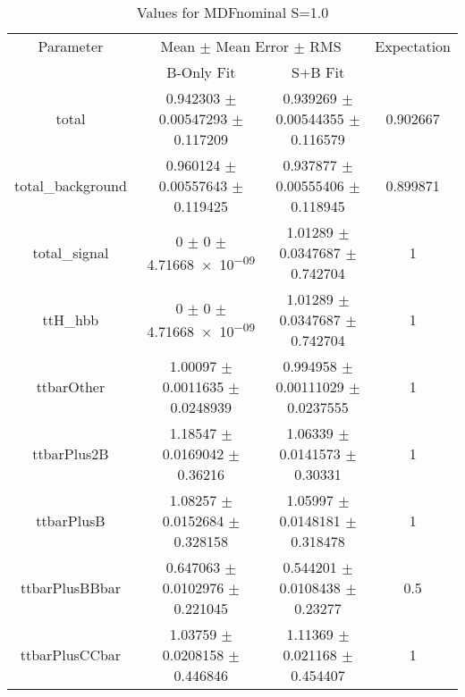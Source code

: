 \begin{table}
\centering
\caption{Values for MDFnominal S=1.0}
\begin{tabular}{cccc}
\toprule
Parameter & \multicolumn{2}{c}{Mean $\pm$ Mean Error $\pm$ RMS} & Expectation\\
 & B-Only Fit & S+B Fit & \\
\midrule
total & \num{0.942303} $\pm$ \num{0.00547293} $\pm$ \num{0.117209} & \num{0.939269} $\pm$ \num{0.00544355} $\pm$ \num{0.116579} & \num{0.902667}\\
total\_background & \num{0.960124} $\pm$ \num{0.00557643} $\pm$ \num{0.119425} & \num{0.937877} $\pm$ \num{0.00555406} $\pm$ \num{0.118945} & \num{0.899871}\\
total\_signal & \num{0} $\pm$ \num{0} $\pm$ \num{4.71668e-09} & \num{1.01289} $\pm$ \num{0.0347687} $\pm$ \num{0.742704} & \num{1}\\
ttH\_hbb & \num{0} $\pm$ \num{0} $\pm$ \num{4.71668e-09} & \num{1.01289} $\pm$ \num{0.0347687} $\pm$ \num{0.742704} & \num{1}\\
ttbarOther & \num{1.00097} $\pm$ \num{0.0011635} $\pm$ \num{0.0248939} & \num{0.994958} $\pm$ \num{0.00111029} $\pm$ \num{0.0237555} & \num{1}\\
ttbarPlus2B & \num{1.18547} $\pm$ \num{0.0169042} $\pm$ \num{0.36216} & \num{1.06339} $\pm$ \num{0.0141573} $\pm$ \num{0.30331} & \num{1}\\
ttbarPlusB & \num{1.08257} $\pm$ \num{0.0152684} $\pm$ \num{0.328158} & \num{1.05997} $\pm$ \num{0.0148181} $\pm$ \num{0.318478} & \num{1}\\
ttbarPlusBBbar & \num{0.647063} $\pm$ \num{0.0102976} $\pm$ \num{0.221045} & \num{0.544201} $\pm$ \num{0.0108438} $\pm$ \num{0.23277} & \num{0.5}\\
ttbarPlusCCbar & \num{1.03759} $\pm$ \num{0.0208158} $\pm$ \num{0.446846} & \num{1.11369} $\pm$ \num{0.021168} $\pm$ \num{0.454407} & \num{1}\\
\bottomrule
\end{tabular}
\end{table}